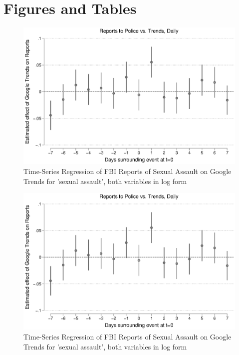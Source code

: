 \documentclass[AER,draftmode]{AEA}
\begin{document}
\clearpage
\section{Figures and Tables}

\begin{figure}
\includegraphics[width=\linewidth]{figures/police_trend_daily_logboth.eps}
\caption{Time-Series Regression of FBI Reports of Sexual Assault on Google Trends for 'sexual assault', both variables in log form} \label{figure:police_trends_daily_logboth}
\end{figure}

\begin{figure}
\includegraphics[width=\linewidth]{figures/police_trend_daily_logboth.eps}
\caption{Time-Series Regression of FBI Reports of Sexual Assault on Google Trends for 'sexual assault', both variables in log form} \label{figure:police_trends_daily_logboth}
\end{figure}
\end{document}
